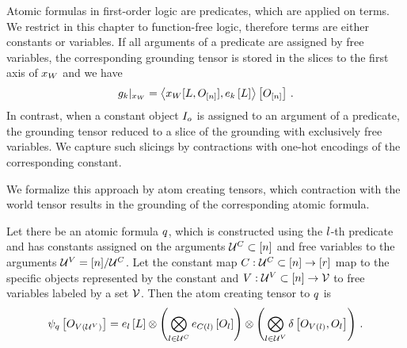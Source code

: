 
Atomic formulas in first-order logic are predicates, which are applied on terms.%
We restrict in this chapter to function-free logic, therefore terms are either constants or variables.
If all arguments of a predicate are assigned by free variables, the corresponding grounding tensor is stored in the slices to the first axis of $x_{W}$ and we have
\begin{align}
    {g_{k}}|_{x_{W}} =
    \left\langle x_{W}[L,O_{[n]}],e_{k}\left[L\right]\right\rangle \left[ O_{[n]} \right] \, .
\end{align}
In contrast, when a constant object $I_{o}$ is assigned to an argument of a predicate, the grounding tensor reduced to a slice of the grounding with exclusively free variables.
We capture such slicings by contractions with one-hot encodings of the corresponding constant.

We formalize this approach by atom creating tensors, which contraction with the world tensor results in the grounding of the corresponding atomic formula.

\begin{definition}\label{def:atomCreatingTensor}
    Let there be an atomic formula $q$, which is constructed using the $l$-th predicate and has constants assigned on the arguments $\mathcal{U}^{C}\subset[n]$ and free variables to the arguments $\mathcal{U}^{V}=[n]/\mathcal{U}^{C}$.
    Let the constant map $C: \mathcal{U}^{C}\subset[n] \rightarrow [r]$ map to the specific objects represented by the constant and $V: \mathcal{U}^{V}\subset[n] \rightarrow \mathcal{V}$ to free variables labeled by a set $\mathcal{V}$.
    Then the atom creating tensor to $q$ is
    \begin{align*}
        \psi_{q}\left[O_{V(\mathcal{U}^{V})}\right]
        = e_{l}\left[L\right] \otimes
        \left( \bigotimes_{l\in\mathcal{U}^{C}} e_{C(l)}\left[O_{l}\right] \right) \otimes
        \left( \bigotimes_{l\in\mathcal{U}^{V}} \delta\left[O_{V(l)},O_{l}\right] \right) \, .
    \end{align*}
\end{definition}

